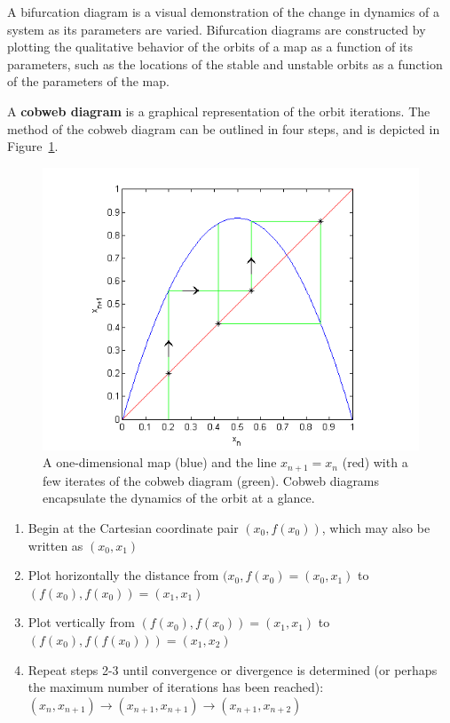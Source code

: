 A bifurcation diagram is a
visual demonstration of the change in dynamics of a system as its
parameters are varied. Bifurcation diagrams are constructed by
plotting the qualitative behavior of the orbits of a map as a function of its
parameters, such as the locations of the stable and unstable orbits as
a function of the parameters of the map. 

A \textbf{cobweb diagram} is a graphical representation of the orbit
iterations. The method of the cobweb diagram can be outlined in four
steps, and is depicted in Figure~\ref{fig:cobex}.
\begin{figure}[!h]
\caption[Example of a cobweb diagram]{A one-dimensional map (blue) and
  the line $x_{n+1}=x_n$ (red) with a few iterates of the cobweb
  diagram (green). Cobweb diagrams encapsulate the dynamics of the orbit at a glance.}\label{fig:cobex}
    \begin{center}
	\includegraphics[scale=0.8]{figs/cobweb_ex.png}
    \end{center}
\end{figure}

\begin{enumerate}
\item Begin at the Cartesian coordinate pair $(x_0, f(x_0))$, which
  may also be written as $(x_0, x_1)$
\item Plot horizontally the distance from $(x_0, f(x_0)=(x_0, x_1)$ to $(f(x_0),
  f(x_0))=(x_1, x_1)$
\item Plot vertically from $(f(x_0), f(x_0))=(x_1, x_1)$ to $(f(x_0), f(f(x_0)))=(x_1, x_2)$
\item Repeat steps 2-3 until convergence or divergence is determined
  (or perhaps the maximum number of iterations has been reached):
  $(x_n, x_{n+1}) \to (x_{n+1}, x_{n+1}) \to (x_{n+1},x_{n+2})$
\end{enumerate}

